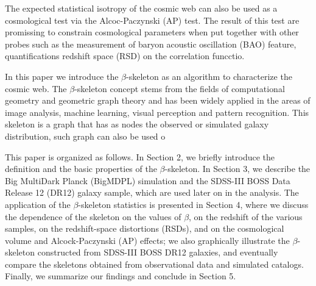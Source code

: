 \documentclass[useAMS,usenatbib]{mnras}
\begin{document}
The expected statistical isotropy of the cosmic web can also be used
as a cosmological test via the Alcoc-Paczynski (AP) test. 
The result of this test are promissing to constrain cosmological
parameters when put together with other
probes such as the measurement of baryon acoustic oscillation (BAO)
feature, quantifications redshift space  (RSD) on the correlation
funcctio. 


In this paper we introduce the $\beta$-skeleton as an algorithm to
characterize the cosmic web. 
The $\beta$-skeleton concept stems from the fields of computational geometry
and geometric graph theory and has been widely applied in the areas of
image analysis, machine learning, visual perception and pattern
recognition. 
This skeleton is a graph that has as nodes the observed or simulated
galaxy distribution, such graph can also be used o 










This paper is organized as follows. 
In Section 2, we briefly introduce the definition and the basic properties of the $\beta$-skeleton. 
In Section 3, we describe the Big MultiDark Planck (BigMDPL) simulation and the SDSS-III BOSS Data Release 12 (DR12) galaxy sample, which are used later on in the analysis. 
The application of the $\beta$-skeleton statistics is presented in Section 4, 
where we discuss the dependence of the skeleton on the values of $\beta$, 
on the redshift of the various samples, on the redshift-space distortions (RSDs), and on the cosmological volume and Alcock-Paczynski (AP) effects; 
we also graphically illustrate the $\beta$-skeleton constructed from SDSS-III BOSS DR12 galaxies,
and eventually compare the skeletons obtained from observational data and simulated catalogs.  
Finally, we summarize our findings and conclude in Section 5. 


\cite{2017A&A...600A.125C}


 
\end{document}
